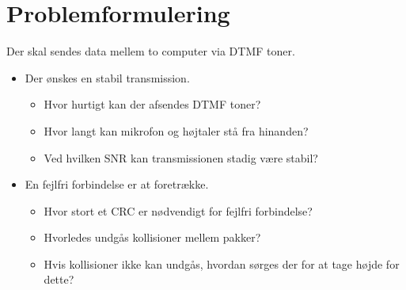 \newpage
\section{Problemformulering}
Der skal sendes data mellem to computer via DTMF toner.
\begin{itemize}
	\item	Der ønskes en stabil transmission.
	\begin{itemize}
	\item	Hvor hurtigt kan der afsendes DTMF toner?
	\item	Hvor langt kan mikrofon og højtaler stå fra hinanden?
	\item	Ved hvilken SNR kan transmissionen stadig være stabil?
	\end{itemize}
	\item	En fejlfri forbindelse er at foretrække.
	\begin{itemize}
	\item	Hvor stort et CRC er nødvendigt for fejlfri 						forbindelse?
	\item	Hvorledes undgås kollisioner mellem pakker?
	\item	Hvis kollisioner ikke kan undgås, hvordan sørges der 				for at tage højde for dette?
	\end{itemize}
\end{itemize}





